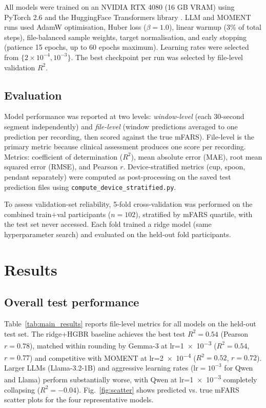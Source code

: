 \documentclass[10pt,twocolumn]{IEEEtran}
\begin{document}
All models were trained on an NVIDIA RTX 4080 (16 GB VRAM)
using PyTorch 2.6 \cite{Paszke2019PyTorch} and the
HuggingFace Transformers library \cite{Wolf2020Transformers}.
LLM and MOMENT runs used AdamW optimisation, Huber loss
($\beta = 1.0$), linear warmup (3\% of total steps),
file-balanced sample weights, target normalisation, and
early stopping (patience 15 epochs, up to 60 epochs maximum).
Learning rates were selected from $\{2 \times 10^{-4}, 10^{-3}\}$.
The best checkpoint per run was selected by file-level validation
$R^2$.

\subsection{Evaluation}

Model performance was reported at two levels:
\textit{window-level} (each 30-second segment independently)
and \textit{file-level} (window predictions averaged to one
prediction per recording, then scored against the true mFARS).
File-level is the primary metric because clinical assessment
produces one score per recording.
Metrics: coefficient of determination ($R^2$), mean absolute
error (MAE), root mean squared error (RMSE), and Pearson $r$.
Device-stratified metrics (cup, spoon, pendant separately) were
computed as post-processing on the saved test prediction files
using \texttt{compute\_device\_stratified.py}.

To assess validation-set reliability, 5-fold cross-validation
was performed on the combined train$+$val participants ($n = 102$),
stratified by mFARS quartile, with the test set never accessed.
Each fold trained a ridge model (same hyperparameter search)
and evaluated on the held-out fold participants.

\section{Results}

\subsection{Overall test performance}

Table~\ref{tab:main_results} reports file-level metrics for all
models on the held-out test set.
The ridge+HGBR baseline achieves the best test $R^2 = 0.54$
(Pearson $r = 0.78$), matched within rounding by
Gemma-3 at lr=\num{1e-3} ($R^2 = 0.54$, $r = 0.77$) and
competitive with MOMENT at lr=\num{2e-4}
($R^2 = 0.52$, $r = 0.72$).
Larger LLMs (Llama-3.2-1B) and aggressive learning rates
($\text{lr} = 10^{-3}$ for Qwen and Llama) perform substantially
worse, with Qwen at lr=\num{1e-3} completely collapsing ($R^2 = -0.04$).
Fig.~\ref{fig:scatter} shows predicted vs. true mFARS scatter plots
for the four representative models.
\end{document}
